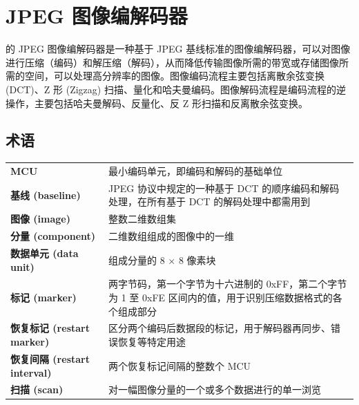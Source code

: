 \documentclass[main\_\_CN.tex]{subfiles}
\begin{document}

\ifglobal
\else
    {\let\clearpage\relax \listoftodos}
    {\let\clearpage\relax \listofdonetodos}
    \tableofcontents
\fi

\hypertarget{jpegcodec}{}
\chapter{JPEG 图像编解码器}
\label{mod:jpegcodec}

\chipname{} 的 JPEG 图像编解码器是一种基于 JPEG 基线标准的图像编解码器，可以对图像进行压缩（编码）和解压缩（解码），从而降低传输图像所需的带宽或存储图像所需的空间，可以处理高分辨率的图像。图像编码流程主要包括离散余弦变换 (DCT)、Z 形 (Zigzag) 扫描、量化和哈夫曼编码。图像解码流程是编码流程的逆操作，主要包括哈夫曼解码、反量化、反 Z 形扫描和反离散余弦变换。

\section{术语}
\begin{longtable}[c]{ R{4cm} p{12cm} }
\textbf{MCU} & 最小编码单元，即编码和解码的基础单位 \\
\textbf{基线 (baseline)} & JPEG 协议中规定的一种基于 DCT 的顺序编码和解码处理，在所有基于 DCT 的解码处理中都需用到 \\
\textbf{图像 (image)} & 整数二维数组集 \\
\textbf{分量 (component)} & 二维数组组成的图像中的一维 \\
\textbf{数据单元 (data unit)} & 组成分量的 8 × 8 像素块 \\
\textbf{标记 (marker)} & 两字节码，第一个字节为十六进制的 0xFF，第二个字节为 1 至 0xFE 区间内的值，用于识别压缩数据格式的各个组成部分 \\
\textbf{恢复标记 (restart marker)} & 区分两个编码后数据段的标记，用于解码器再同步、错误恢复等特定用途 \\
\textbf{恢复间隔 (restart interval)} & 两个恢复标记间隔的整数个 MCU  \\
\textbf{扫描 (scan)} & 对一幅图像分量的一个或多个数据进行的单一浏览\\
\end{longtable}
\end{document}
